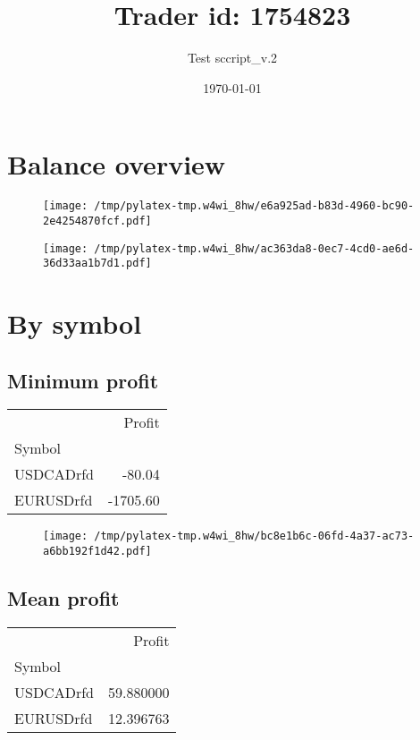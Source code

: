 \documentclass{article}%
\title{Trader id: 1754823}%
\author{Test sccript\_v.2}%
\date{\today}%
\begin{document}
%
\normalsize%
\maketitle%
\section{Balance overview}%
\label{sec:Balanceoverview}%


\begin{figure}[htbp]%
\centering%
\texttt{[image: /tmp/pylatex-tmp.w4wi\_8hw/e6a925ad-b83d-4960-bc90-2e4254870fcf.pdf]}%
\end{figure}

%


\begin{figure}[htbp]%
\centering%
\texttt{[image: /tmp/pylatex-tmp.w4wi\_8hw/ac363da8-0ec7-4cd0-ae6d-36d33aa1b7d1.pdf]}%
\end{figure}

%
\section{By symbol}%
\label{sec:Bysymbol}%
\subsection{Minimum profit }%
\label{subsec:Minimumprofit}%
\begin{tabular}{lr}
\toprule
{} &   Profit \\
Symbol    &          \\
\midrule
USDCADrfd &   -80.04 \\
EURUSDrfd & -1705.60 \\
\bottomrule
\end{tabular}
%


\begin{figure}[htbp]%
\centering%
\texttt{[image: /tmp/pylatex-tmp.w4wi\_8hw/bc8e1b6c-06fd-4a37-ac73-a6bb192f1d42.pdf]}%
\end{figure}

%
\newpage %
\subsection{Mean profit }%
\label{subsec:Meanprofit}%
\begin{tabular}{lr}
\toprule
{} &     Profit \\
Symbol    &            \\
\midrule
USDCADrfd &  59.880000 \\
EURUSDrfd &  12.396763 \\
\bottomrule
\end{tabular}
%
\end{document}
